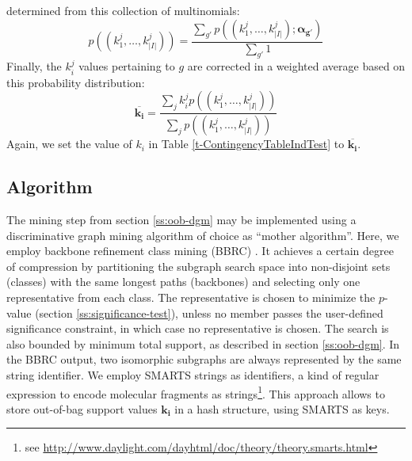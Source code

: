 \documentclass{sig-alternate}
\begin{document}
determined from this collection of multinomials:
\begin{equation}
  p((k_1^j,\ldots,k_{\vert I\vert}^j))=\frac{\sum_{g'} p((k_1^j,\ldots,k_{\vert I\vert}^j); \mathbf{\alpha_{g'}})}{\sum_{g'}1}
  \label{eqn:avgpr}
\end{equation}
Finally, the $k_i^j$ values pertaining to $g$ are corrected in a weighted average
based on this probability distribution:
\begin{equation}
  \overline{\mathbf{k_i}}=\frac{\sum_j k_i^j p((k_1^j,\ldots,k_{\vert I\vert}^j))}{\sum_j p((k_1^j,\ldots,k_{\vert I\vert}^j))}
  \label{eqn:avgki}
\end{equation}
Again, we set the value of $k_i$ in Table \ref{t-ContingencyTableIndTest} to $\overline{\mathbf{k_i}}$.

\subsection{Algorithm}
\label{s:Algorithm}
The mining step from section \ref{ss:oob-dgm} may be 
implemented using a discriminative graph mining algorithm of choice as ``mother algorithm''. Here, we
employ backbone refinement class mining (BBRC) \cite{maunz11efficient}. It
achieves a certain degree of compression by partitioning the subgraph search space into non-disjoint sets (classes) with the same
longest paths (backbones) and selecting only one representative from each
class. 
The representative is chosen to minimize the $p$-value (section \ref{ss:significance-test}), unless no member passes the user-defined significance constraint, in which case no representative is chosen.
The search is also bounded by minimum total support, as described in section \ref{ss:oob-dgm}.
In the BBRC output, two isomorphic subgraphs are always represented by the same string identifier.
We employ SMARTS strings as identifiers, a kind of regular expression to encode
molecular fragments as strings\footnote{see \url{http://www.daylight.com/dayhtml/doc/theory/theory.smarts.html}}.  This approach allows to store out-of-bag support values $\mathbf{k_i}$ in a
hash structure, using SMARTS as keys. 
\end{document}
